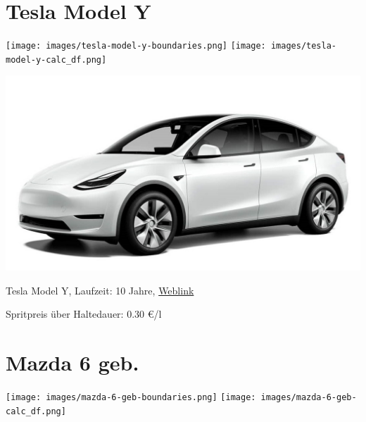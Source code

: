 \documentclass[landscape, DIV=99, 14pt]{scrartcl}
\begin{document}
\pagebreak


\twocolumn

\section*{Tesla Model Y}
\begin{center}
\texttt{[image: images/tesla-model-y-boundaries.png]}
\null
\vspace{0.5cm}
\texttt{[image: images/tesla-model-y-calc\_df.png]}
\end{center}

\pagebreak
\null
\vspace{2cm}
\begin{center}
\includegraphics[width=0.9\columnwidth]{cars/tesla-model-y.jpg}

Tesla Model Y, Laufzeit: 10 Jahre, \href{https://www.tesla.com/de_de/modely/design\#overview}{Weblink}

Spritpreis \"uber Haltedauer: 0.30 \euro{}/l

\end{center}

\pagebreak


\twocolumn

\section*{Mazda 6 geb.}
\begin{center}
\texttt{[image: images/mazda-6-geb-boundaries.png]}
\null
\vspace{0.5cm}
\texttt{[image: images/mazda-6-geb-calc\_df.png]}
\end{center}
\end{document}
